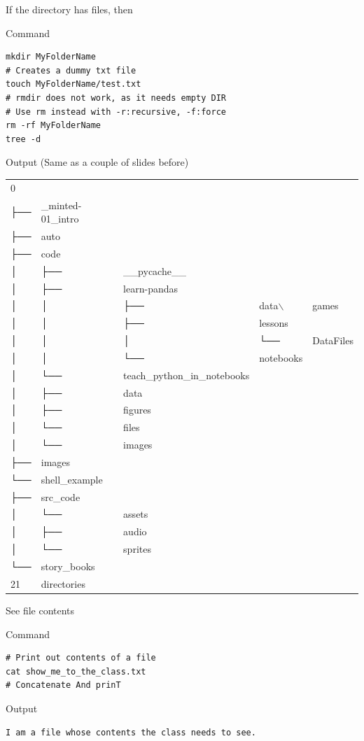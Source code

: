 \documentclass[presentation]{beamer}
\begin{document}
\begin{frame}[label={sec:org7ecb52b},fragile]{If the directory has files, then}
 \begin{block}{Command}
\begin{verbatim}
mkdir MyFolderName
# Creates a dummy txt file
touch MyFolderName/test.txt
# rmdir does not work, as it needs empty DIR
# Use rm instead with -r:recursive, -f:force
rm -rf MyFolderName
tree -d
\end{verbatim}
\end{block}

\alert{Output} (Same as a couple of slides before)
\tiny
\begin{center}
\begin{tabular}{lllll}
\toprule
0 &  &  &  & \\
├── & \_minted-01\_intro &  &  & \\
├── & auto &  &  & \\
├── & code &  &  & \\
│   & ├── & \_\_pycache\_\_ &  & \\
│   & ├── & learn-pandas &  & \\
│   & │   & ├── & data$\backslash$ & games\\
│   & │   & ├── & lessons & \\
│   & │   & │   & └── & DataFiles\\
│   & │   & └── & notebooks & \\
│   & └── & teach\_python\_in\_notebooks &  & \\
│   & ├── & data &  & \\
│   & ├── & figures &  & \\
│   & └── & files &  & \\
│   & └── & images &  & \\
├── & images &  &  & \\
└── & shell\_example &  &  & \\
├── & src\_code &  &  & \\
│   & └── & assets &  & \\
│   & ├── & audio &  & \\
│   & └── & sprites &  & \\
└── & story\_books &  &  & \\
21 & directories &  &  & \\
\bottomrule
\end{tabular}
\end{center}
\end{frame}

\begin{frame}[label={sec:org1f96a4a},fragile]{See file contents}
 \begin{block}{Command}
\begin{verbatim}
# Print out contents of a file
cat show_me_to_the_class.txt
# Concatenate And prinT
\end{verbatim}
\end{block}

\alert{Output}
\small
\begin{verbatim}
I am a file whose contents the class needs to see.
\end{verbatim}
\end{frame}
\end{document}

